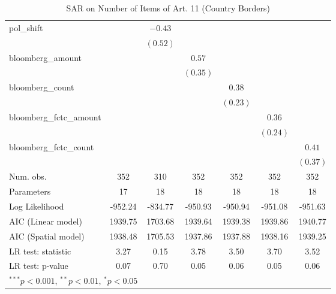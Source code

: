 \begin{table}[!h]
\begin{center}
\begin{tabular}{l c c c c c c }
pol\_shift              &              & $-0.43$      &              &              &              &              \\
                        &              & $(0.52)$     &              &              &              &              \\
bloomberg\_amount       &              &              & $0.57$       &              &              &              \\
                        &              &              & $(0.35)$     &              &              &              \\
bloomberg\_count        &              &              &              & $0.38$       &              &              \\
                        &              &              &              & $(0.23)$     &              &              \\
bloomberg\_fctc\_amount &              &              &              &              & $0.36$       &              \\
                        &              &              &              &              & $(0.24)$     &              \\
bloomberg\_fctc\_count  &              &              &              &              &              & $0.41$       \\
                        &              &              &              &              &              & $(0.37)$     \\
\midrule
Num. obs.               & 352          & 310          & 352          & 352          & 352          & 352          \\
Parameters              & 17           & 18           & 18           & 18           & 18           & 18           \\
Log Likelihood          & -952.24      & -834.77      & -950.93      & -950.94      & -951.08      & -951.63      \\
AIC (Linear model)      & 1939.75      & 1703.68      & 1939.64      & 1939.38      & 1939.86      & 1940.77      \\
AIC (Spatial model)     & 1938.48      & 1705.53      & 1937.86      & 1937.88      & 1938.16      & 1939.25      \\
LR test: statistic      & 3.27         & 0.15         & 3.78         & 3.50         & 3.70         & 3.52         \\
LR test: p-value        & 0.07         & 0.70         & 0.05         & 0.06         & 0.05         & 0.06         \\
\bottomrule
\multicolumn{7}{l}{\scriptsize{$^{***}p<0.001$, $^{**}p<0.01$, $^*p<0.05$}}
\end{tabular}
\caption{SAR on Number of Items of Art. 11 (Country Borders)}
\label{table:coefficients}
\end{center}
\end{table}
